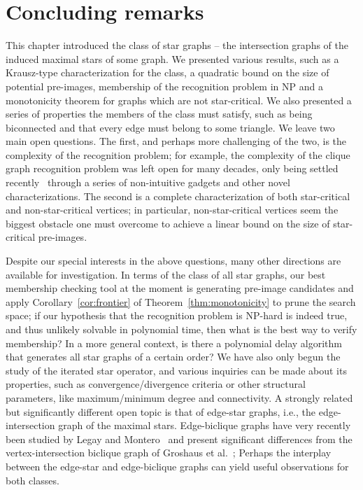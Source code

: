 \section{Concluding remarks}

This chapter introduced the class of star graphs -- the intersection graphs of the induced maximal stars of some graph.
We presented various results, such as a Krausz-type characterization for the class, a quadratic bound on the size of potential pre-images, membership of the recognition problem in \textsf{NP} and a monotonicity theorem for graphs which are not star-critical.
We also presented a series of properties the members of the class must satisfy, such as being biconnected and that every edge must belong to some triangle.
We leave two main open questions.
The first, and perhaps more challenging of the two, is the complexity of the recognition problem; for example, the complexity of the clique graph recognition problem was left open for many decades, only being settled recently~\cite{clique_recognition} through a series of non-intuitive gadgets and other novel characterizations.
The second is a complete characterization of both star-critical and non-star-critical vertices; in particular, non-star-critical vertices seem the biggest obstacle one must overcome to achieve a linear bound on the size of star-critical pre-images.

Despite our special interests in the above questions, many other directions are available for investigation.
In terms of the class of all star graphs, our best membership checking tool at the moment is generating pre-image candidates and apply Corollary~\ref{cor:frontier} of Theorem~\ref{thm:monotonicity} to prune the search space; if our hypothesis that the recognition problem is \textsf{NP-hard} is indeed true, and thus unlikely solvable in polynomial time, then what is the best way to verify membership?
In a more general context, is there a polynomial delay algorithm that generates all star graphs of a certain order?
We have also only begun the study of the iterated star operator, and various inquiries can be made about its properties, such as convergence/divergence criteria or other structural parameters, like maximum/minimum degree and connectivity.
A strongly related but significantly different open topic is that of edge-star graphs, i.e., the edge-intersection graph of the maximal stars.
Edge-biclique graphs have very recently been studied by Legay and Montero~\cite{edge_biclique} and present significant differences from the vertex-intersection biclique graph of Groshaus et al.~\cite{biclique_graph};
Perhaps the interplay between the edge-star and edge-biclique graphs can yield useful observations for both classes.